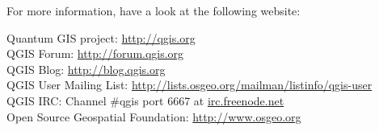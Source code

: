 
For more information, have a look at the following website:

Quantum GIS project: \url{http://qgis.org}
\\QGIS Forum: \url{http://forum.qgis.org}
\\QGIS Blog: \url{http://blog.qgis.org}
\\QGIS User Mailing List: \url{http://lists.osgeo.org/mailman/listinfo/qgis-user}
\\QGIS IRC: Channel \#qgis port 6667 at \url{irc.freenode.net}
\\Open Source Geospatial Foundation: \url{http://www.osgeo.org}



